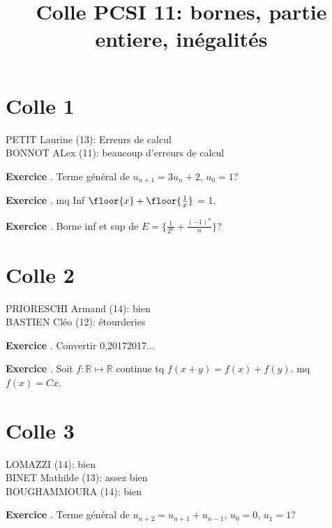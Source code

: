 \documentclass[10pt,a4paper]{article}
\title{Colle PCSI 11: bornes, partie entiere, inégalités}
\newcounter{question}
\newcounter{exo}
\newenvironment{exo}{\vspace{0.5cm}\setcounter{question}{0}\addtocounter{exo}{1} \noindent \textbf{Exercice \theexo}. \normalsize }{\par}
\begin{document}
	\maketitle

	\section*{Colle 1}
	PETIT Laurine (13): Erreurs de calcul\\
	BONNOT ALex (11): beaucoup d'erreurs de calcul\\
	
	\begin{exo}
		Terme général de $u_{n+1} = 3 u_n + 2$, $u_0 = 1$?
	\end{exo}	
	
	\begin{exo}
		mq Inf $\floor{x} + \floor{\frac{1}{x}}$ = 1.
	\end{exo}
	
	\begin{exo}
		Borne inf et sup de $E = \lbrace \frac{1}{2^n} + \frac{(-1)^n}{n} \rbrace$?
	\end{exo}
	\section*{Colle 2}
	\setcounter{exo}{0}
	PRIORESCHI Armand (14): bien \\
	BASTIEN Cléo (12): étourderies\\
	
	\begin{exo}
		Convertir 0,20172017...
	\end{exo}

	\begin{exo}
		Soit $f : \mathbb{R} \longmapsto \mathbb{R}$ continue tq $f(x + y) = f(x) + f(y)$.  mq $f(x) = C x$.
	\end{exo}	
	
	\section*{Colle 3}
	\setcounter{exo}{0}
	LOMAZZI (14): bien\\
	BINET Mathilde (13): assez bien\\
	BOUGHAMMOURA (14): bien\\
	
	\begin{exo}
		Terme général de $u_{n+2} = u_{n+1} + u_{n-1}$, $u_0 = 0$, $u_1 = 1$?
	\end{exo}	
	
\end{document}
